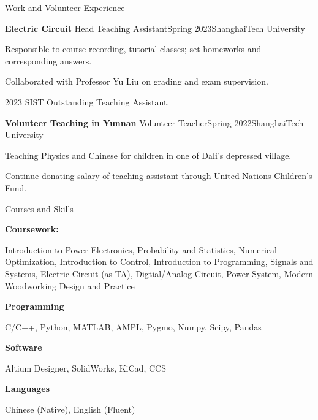 \documentclass[]{ZhongtaoGuan-resume}
\begin{document}
\newpage

\begin{section}{Work and Volunteer Experience}
 \begin{subsection}{\textbf{Electric Circuit}}
     {Head Teaching Assistant}{Spring 2023}{ShanghaiTech University}
     \item{Responsible to course recording, tutorial classes; set homeworks and corresponding answers.}
     \item {Collaborated with Professor Yu Liu on grading and exam supervision.}
     \item{2023 SIST Outstanding Teaching Assistant.}
 \end{subsection}
 \begin{subsection}{\textbf{Volunteer Teaching in Yunnan}}
     {Volunteer Teacher}{Spring 2022}{ShanghaiTech University}
     \item{Teaching Physics and Chinese for children in one of Dali's depressed village.}
     \item{Continue donating salary of teaching assistant through United Nations Children's Fund.}
 \end{subsection}
\end{section}

\begin{section}{Courses and Skills}

\begin{subsectionnobullet}{\textbf{Coursework:}}{}{}{}
 \item {Introduction to Power Electronics, Probability and Statistics, Numerical Optimization, Introduction to Control, Introduction to Programming,
Signals and Systems, Electric Circuit (as TA), Digtial/Analog Circuit, Power System, Modern Woodworking Design and Practice}
\end{subsectionnobullet}
\begin{subsectionnobullet}{\textbf{Programming}}{}{}{}
    \item {C/C++, Python, MATLAB, AMPL, Pygmo, Numpy, Scipy, Pandas}
\end{subsectionnobullet}
\begin{subsectionnobullet}{\textbf{Software}}{}{}{}
    \item {Altium Designer, SolidWorks, KiCad, CCS}
\end{subsectionnobullet}
\begin{subsectionnobullet}{\textbf{Languages}}{}{}{}
    \item {Chinese (Native), English (Fluent)}
\end{subsectionnobullet}
\end{section}
\end{document}
